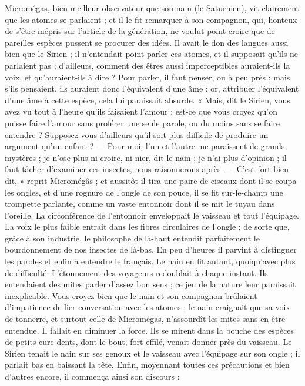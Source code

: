 \documentclass[a4paper, 11pt, oneside, landscape]{article}
\begin{document}
Micromégas, bien meilleur observateur que son nain (le Saturnien), vit clairement que les atomes se parlaient ; et il le fit remarquer à son compagnon, qui, honteux de s'être mépris sur l'article de la génération, ne voulut point croire que de pareilles espèces pussent se procurer des idées. Il avait le don des langues aussi bien que le Sirien ; il n'entendait point parler ces atomes, et il supposait qu'ils ne parlaient pas ; d'ailleurs, comment des êtres aussi imperceptibles auraient-ils la voix, et qu'auraient-ils à dire ? Pour parler, il faut penser, ou à peu près ; mais s'ils pensaient, ils auraient donc l'équivalent d'une âme : or, attribuer l'équivalent d'une âme à cette espèce, cela lui paraissait absurde. « Mais, dit le Sirien, vous avez vu tout à l'heure qu'ils faisaient l'amour ; est-ce que vous croyez qu'on puisse faire l'amour sans proférer une seule parole, ou du moins sans se faire entendre ? Supposez-vous d'ailleurs qu'il soit plus difficile de produire un argument qu'un enfant ? --- Pour moi, l'un et l'autre me paraissent de grands mystères ; je n'ose plus ni croire, ni nier, dit le nain ; je n'ai plus d'opinion ; il faut tâcher d'examiner ces insectes, nous raisonnerons après. --- C'est fort bien dit, » reprit Micromégâs ; et aussitôt il tira une paire de ciseaux dont il se coupa les ongles, et d'une rognure de l'ongle de son pouce, il se fit sur-le-champ une trompette parlante, comme un vaste entonnoir dont il se mit le tuyau dans l'oreille. La circonférence de l'entonnoir enveloppait le vaisseau et tout l'équipage. La voix le plus faible entrait dans les fibres circulaires de l'ongle ; de sorte que, grâce à son industrie, le philosophe de là-haut entendit parfaitement le bourdonnement de nos insectes de là-bas. En peu d'heures il parvint à distinguer les paroles et enfin à entendre le français. Le nain en fit autant, quoiqu'avec plus de difficulté. L'étonnement des voyageurs redoublait à chaque instant. Ils entendaient des mites parler d'assez bon sens ; ce jeu de la nature leur paraissait inexplicable. Vous croyez bien que le nain et son compagnon brûlaient d'impatience de lier conversation avec les atomes ; le nain craignait que sa voix de tonnerre, et surtout celle de Micromégas, n'assourdît les mites sans en être entendue. Il fallait en diminuer la force. Ils se mirent dans la bouche des espèces de petits cure-dents, dont le bout, fort effilé, venait donner près du vaisseau. Le Sirien tenait le nain sur ses genoux et le vaisseau avec l'équipage sur son ongle ; il parlait bas en baissant la tête. Enfin, moyennant toutes ces précautions et bien d'autres encore, il commença ainsi son discours :
\end{document}
